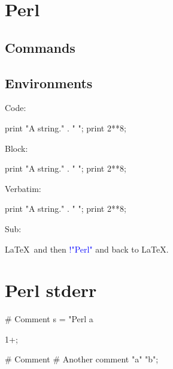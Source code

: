 \documentclass[11pt]{article}
\begin{document}
\section*{Perl}

\subsection*{Commands}




\printpythontex




\subsection*{Environments}

Code:
\begin{perlcode}
print "A string." . " ";
print 2**8;
\end{perlcode}

Block:
\begin{perlblock}
print "A string." . " ";
print 2**8;
\end{perlblock}

\printpythontex

Verbatim:
\begin{perlverbatim}
print "A string." . " ";
print 2**8;
\end{perlverbatim}

Sub:
\begin{perlsub}
\LaTeX\ and then \textcolor{blue}{!{"Perl"}} and back to \LaTeX.
\end{perlsub}


\section*{Perl stderr}


\begin{perlblock}[err1][numbers=left]
# Comment
s = "Perl a
\end{perlblock}

\stderrpythontex[][breaklines, breakafter=\\/]

\begin{perlblock}[err2][numbers=left]
1+;
\end{perlblock}

\stderrpythontex[][breaklines, breakafter=\\/]

\begin{perlblock}[err3][numbers=left]
# Comment
# Another comment
"a" "b";
\end{perlblock}

\stderrpythontex[][breaklines, breakafter=\\/]
\end{document}
